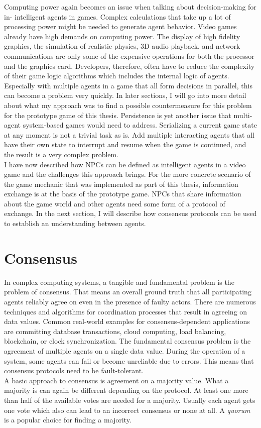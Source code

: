 Computing power again becomes an issue when talking about decision-making for in- intelligent agents in games. Complex calculations that take up a lot of processing power might be needed to generate agent behavior. Video games already have high demands on computing power. The display of high fidelity graphics, the simulation of realistic physics, 3D audio playback, and network communications are only some of the expensive operations for both the processor and the graphics card. Developers, therefore, often have to reduce the complexity of their game logic algorithms which includes the internal logic of agents. Especially with multiple agents in a game that all form decisions in parallel, this can become a problem very quickly. In later sections, I will go into more detail about what my approach was to find a possible countermeasure for this problem for the prototype game of this thesis. Persistence is yet another issue that multi-agent system-based games would need to address. Serializing a current game state at any moment is not a trivial task as is. Add multiple interacting agents that all have their own state to interrupt and resume when the game is continued, and the result is a very complex problem.~\cite{Dignum2009}\\
I have now described how NPCs can be defined as intelligent agents in a video game and the challenges this approach brings. For the more concrete scenario of the game mechanic that was implemented as part of this thesis, information exchange is at the basis of the prototype game. NPCs that share information about the game world and other agents need some form of a protocol of exchange. In the next section, I will describe how consensus protocols can be used to establish an understanding between agents.
\section{Consensus}
In complex computing systems, a tangible and fundamental problem is the problem of consensus. That means an overall ground truth that all participating agents reliably agree on even in the presence of faulty actors. There are numerous techniques and algorithms for coordination processes that result in agreeing on data values. Common real-world examples for consensus-dependent applications are committing database transactions, cloud computing, load balancing, blockchain, or clock synchronization. The fundamental consensus problem is the agreement of multiple agents on a single data value. During the operation of a system, some agents can fail or become unreliable due to errors. This means that consensus protocols need to be fault-tolerant.~\cite{Van2002}\\
A basic approach to consensus is agreement on a majority value. What a majority is can again be different depending on the protocol. At least one more than half of the available votes are needed for a majority. Usually each agent gets one vote which also can lead to an incorrect consensus or none at all. A \textit{quorum} is a popular choice for finding a majority.
